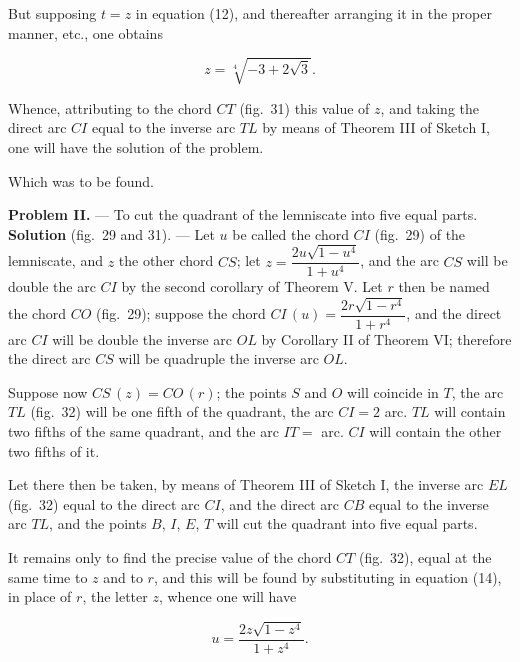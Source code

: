\documentclass{article}
\begin{document}

But supposing $t = z$ in equation (12), and thereafter arranging it in the proper manner, etc.,
one obtains

\[ z = \sqrt[4]{-3+2\sqrt{3}}. \]

Whence, attributing to the chord $CT$ (fig.~31) this value of $z$, and taking the direct arc $CI$
equal to the inverse arc $TL$ by means of Theorem III of Sketch I, one will have the solution of
the problem.

Which was to be found.

\textbf{Problem II.} --- To cut the quadrant of the lemniscate into five equal parts.
\textbf{Solution} (fig.~29 and 31). --- Let $u$ be called the chord $CI$ (fig.~29) of the
lemniscate, and $z$ the other chord $CS$; let $z = \dfrac{2u\sqrt{1-u^{4}}}{1+u^{4}}$, and the
arc $CS$ will be double the arc $CI$ by the second corollary of Theorem V. Let $r$ then be named
the chord $CO$ (fig.~29); suppose the chord $CI\,(u) = \dfrac{2r\sqrt{1-r^{4}}}{1+r^{4}}$, and
the direct arc $CI$ will be double the inverse arc $OL$ by Corollary II of Theorem VI; therefore
the direct arc $CS$ will be quadruple the inverse arc $OL$.

Suppose now $CS\,(z) = CO\,(r)$; the points $S$ and $O$ will coincide in $T$, the arc $TL$
(fig.~32) will be one fifth of the quadrant, the arc $CI = 2$ arc. $TL$ will contain two fifths
of the same quadrant, and the arc $IT = $ arc. $CI$ will contain the other two fifths of it.

Let there then be taken, by means of Theorem III of Sketch I, the inverse arc $EL$ (fig.~32)
equal to the direct arc $CI$, and the direct arc $CB$ equal to the inverse arc $TL$, and the
points $B$, $I$, $E$, $T$ will cut the quadrant into five equal parts.

It remains only to find the precise value of the chord $CT$ (fig.~32), equal at the same time to
$z$ and to $r$, and this will be found by substituting in equation (14), in place of $r$, the
letter $z$, whence one will have

\[ u = \frac{2z\sqrt{1-z^{4}}}{1+z^{4}}. \tag{15} \]
\end{document}
